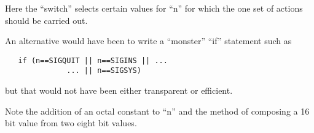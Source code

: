 Here  the  ``switch''   selects certain
values for ``n'' for which the one set of
actions should be carried out.

An alternative would have been to write
a ``monster'' ``if'' statement such as

\begin{verbatim}
   if (n==SIGQUIT || n==SIGINS || ...
              ... || n==SIGSYS)
\end{verbatim}

\noindent but that would  not  have  been  either
transparent or efficient.

Note the addition of an octal  constant
to ``n'' and the method of composing a 16
bit value from two eight bit values.
